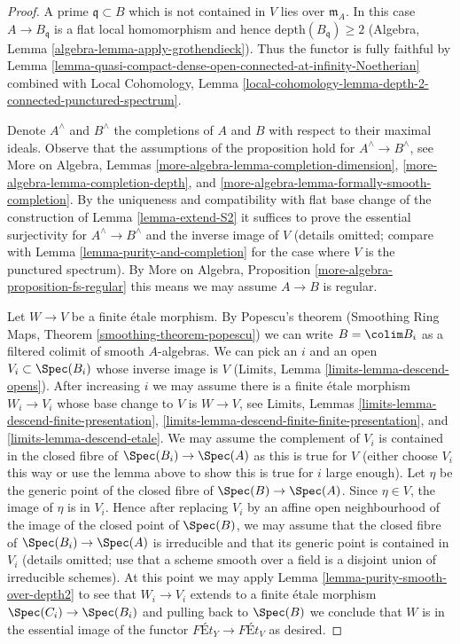 \begin{proof}
A prime $\mathfrak q \subset B$ which is not contained in $V$
lies over $\mathfrak m_A$. In this case $A \to B_\mathfrak q$
is a flat local homomorphism and hence $\text{depth}(B_\mathfrak q) \geq 2$
(Algebra, Lemma \ref{algebra-lemma-apply-grothendieck}).
Thus the functor is fully faithful by
Lemma \ref{lemma-quasi-compact-dense-open-connected-at-infinity-Noetherian}
combined with Local Cohomology,
Lemma \ref{local-cohomology-lemma-depth-2-connected-punctured-spectrum}.

\medskip\noindent
Denote $A^\wedge$ and $B^\wedge$ the completions of $A$ and $B$
with respect to their maximal ideals. Observe that the assumptions
of the proposition hold for $A^\wedge \to B^\wedge$, see
More on Algebra, Lemmas
\ref{more-algebra-lemma-completion-dimension},
\ref{more-algebra-lemma-completion-depth}, and
\ref{more-algebra-lemma-formally-smooth-completion}.
By the uniqueness and compatibility with flat base change
of the construction of  Lemma \ref{lemma-extend-S2}
it suffices to prove the essential surjectivity for
$A^\wedge \to B^\wedge$ and the inverse image of $V$
(details omitted; compare with Lemma \ref{lemma-purity-and-completion}
for the case where $V$ is the punctured spectrum).
By More on Algebra, Proposition \ref{more-algebra-proposition-fs-regular}
this means we may assume $A \to B$ is regular.

\medskip\noindent
Let $W \to V$ be a finite \'etale morphism.
By Popescu's theorem
(Smoothing Ring Maps, Theorem \ref{smoothing-theorem-popescu})
we can write $B = \colim B_i$ as a filtered colimit
of smooth $A$-algebras. We can pick an $i$ and an
open $V_i \subset \Spec(B_i)$ whose inverse image is $V$
(Limits, Lemma \ref{limits-lemma-descend-opens}).
After increasing $i$ we may assume there is a finite
\'etale morphism $W_i \to V_i$ whose base change to $V$
is $W \to V$, see
Limits, Lemmas \ref{limits-lemma-descend-finite-presentation},
\ref{limits-lemma-descend-finite-finite-presentation}, and
\ref{limits-lemma-descend-etale}.
We may assume the complement of $V_i$ is contained
in the closed fibre of $\Spec(B_i) \to \Spec(A)$ as this
is true for $V$ (either choose $V_i$ this way or use
the lemma above to show this is true for $i$ large enough).
Let $\eta$ be the generic point of the closed fibre
of $\Spec(B) \to \Spec(A)$. Since $\eta \in V$, the image of
$\eta$ is in $V_i$. Hence after replacing $V_i$ by an
affine open neighbourhood of the image of the closed point
of $\Spec(B)$, we may assume that the closed fibre
of $\Spec(B_i) \to \Spec(A)$ is irreducible and that
its generic point is contained in $V_i$ (details omitted; use that
a scheme smooth over a field is a disjoint union of irreducible schemes).
At this point we may apply Lemma \ref{lemma-purity-smooth-over-depth2}
to see that $W_i \to V_i$ extends to a finite \'etale
morphism $\Spec(C_i) \to \Spec(B_i)$ and pulling
back to $\Spec(B)$ we conclude that $W$ is in
the essential image of the functor
$\textit{F\'Et}_Y \to \textit{F\'Et}_V$
as desired.
\end{proof}





